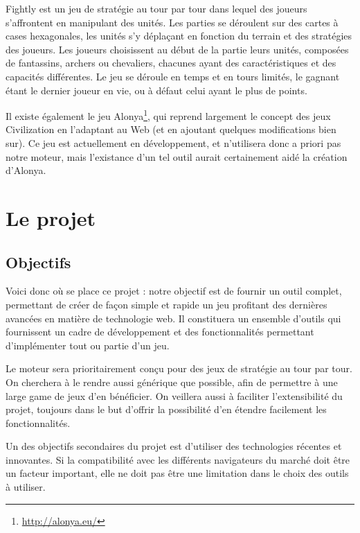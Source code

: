 \documentclass[a4paper,10pt]{report}
\begin{document}
      Fightly est un jeu de stratégie au tour par tour dans lequel des joueurs s'affrontent en manipulant des unités. Les parties se déroulent sur des cartes à cases hexagonales, les unités s'y déplaçant en fonction du terrain et des stratégies des joueurs. Les joueurs choisissent au début de la partie leurs unités, composées de fantassins, archers ou chevaliers, chacunes ayant des caractéristiques et des capacités différentes. Le jeu se déroule en temps et en tours limités, le gagnant étant le dernier joueur en vie, ou à défaut celui ayant le plus de points. 
      
      Il existe également le jeu Alonya\footnote{\url{http://alonya.eu/}}, qui reprend largement le concept des jeux Civilization en l'adaptant au Web (et en ajoutant quelques modifications bien sur). Ce jeu est actuellement en développement, et n'utilisera donc a priori pas notre moteur, mais l'existance d'un tel outil aurait certainement aidé la création d'Alonya. 



  \chapter{Le projet}

    \section{Objectifs}

      Voici donc où se place ce projet : notre objectif est de fournir un outil complet, permettant de créer de façon simple et rapide un jeu profitant des dernières avancées en matière de technologie web. Il constituera un ensemble d'outils qui fournissent un cadre de développement et des fonctionnalités permettant d'implémenter tout ou partie d'un jeu.

      Le moteur sera prioritairement conçu pour des jeux de stratégie au tour par tour. On cherchera à le rendre aussi générique que possible, afin de permettre à une large game de jeux d'en bénéficier. On veillera aussi à faciliter l'extensibilité du projet, toujours dans le but d'offrir la possibilité d'en étendre facilement les fonctionnalités.

      Un des objectifs secondaires du projet est d'utiliser des technologies récentes et innovantes. Si la compatibilité avec les différents navigateurs du marché doit être un facteur important, elle ne doit pas être une limitation dans le choix des outils à utiliser. 
\end{document}
